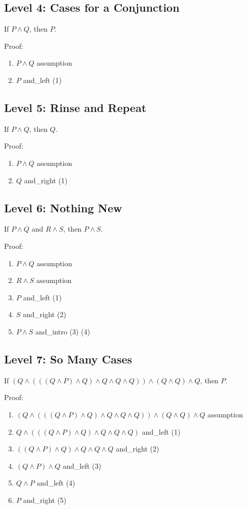 \documentclass{article}
\theoremstyle{theorem}
\theoremstyle{definition}
\theoremstyle{remark}
\begin{document}
\subsection{Level 4: Cases for a Conjunction}
If $P \wedge Q$, then $P$.

Proof:
\begin{enumerate}
    \item $P \wedge Q$ \hfill assumption
    \item $P$ \hfill and\_left (1)
\end{enumerate}

\subsection{Level 5: Rinse and Repeat}
If $P \wedge Q$, then $Q$.

Proof:
\begin{enumerate}
    \item $P \wedge Q$ \hfill assumption
    \item $Q$ \hfill and\_right (1)
\end{enumerate}

\subsection{Level 6: Nothing New}
If $P \wedge Q$ and $R \wedge S$, then $P \wedge S$.

Proof:
\begin{enumerate}
    \item $P \wedge Q$ \hfill assumption
    \item $R \wedge S$ \hfill assumption
    \item $P$ \hfill and\_left (1)
    \item $S$ \hfill and\_right (2)
    \item $P \wedge S$ \hfill and\_intro (3) (4)
\end{enumerate}

\subsection{Level 7: So Many Cases}
If $(Q \wedge (((Q \wedge P) \wedge Q) \wedge Q \wedge Q \wedge Q)) \wedge (Q \wedge Q) \wedge Q$, then $P$.

Proof:
\begin{enumerate}
    \item $(Q \wedge (((Q \wedge P) \wedge Q) \wedge Q \wedge Q \wedge Q)) \wedge (Q \wedge Q) \wedge Q$ \hfill assumption
    \item $Q \wedge (((Q \wedge P) \wedge Q) \wedge Q \wedge Q \wedge Q)$ \hfill and\_left (1)
    \item $((Q \wedge P) \wedge Q) \wedge Q \wedge Q \wedge Q$ \hfill and\_right (2)
    \item $(Q \wedge P) \wedge Q$ \hfill and\_left (3)
    \item $Q \wedge P$ \hfill and\_left (4)
    \item $P$ \hfill and\_right (5)
\end{enumerate}
\end{document}
